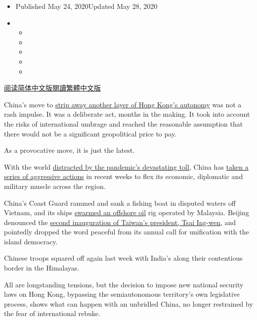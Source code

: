 \begin{itemize}
\item
  Published May 24, 2020Updated May 28, 2020
\item
  \begin{itemize}
  \item
  \item
  \item
  \item
  \item
  \end{itemize}
\end{itemize}

\href{https://cn.nytimes.com/china/20200525/china-hong-kong-taiwan/}{阅读简体中文版}\href{https://cn.nytimes.com/china/20200525/china-hong-kong-taiwan/zh-hant}{閱讀繁體中文版}

China's move to
\href{https://www.nytimes.com/2020/05/23/world/asia/hong-kong-china.html}{strip
away another layer of Hong Kong's autonomy} was not a rash impulse. It
was a deliberate act, months in the making. It took into account the
risks of international umbrage and reached the reasonable assumption
that there would not be a significant geopolitical price to pay.

As a provocative move, it is just the latest.

With the world
\href{https://www.nytimes.com/2020/05/22/business/china-hong-kong-national-security.html}{distracted
by the pandemic's devastating toll}, China has
\href{https://www.nytimes.com/2020/05/21/us/politics/trump-china-hong-kong.html}{taken
a series of aggressive actions} in recent weeks to flex its economic,
diplomatic and military muscle across the region.

China's Coast Guard rammed and sank a fishing boat in disputed waters
off Vietnam, and its ships
\href{https://www.nytimes.com/2020/04/21/world/asia/coronavirus-south-china-sea-warships.html}{swarmed
an offshore oil} rig operated by Malaysia. Beijing denounced the
\href{https://www.nytimes.com/2016/05/21/world/asia/taiwan-president-tsai-ing-wen.html}{second
inauguration of Taiwan's president, Tsai Ing-wen}, and pointedly dropped
the word peaceful from its annual call for unification with the island
democracy.

Chinese troops squared off again last week with India's along their
contentious border in the Himalayas.

All are longstanding tensions, but the decision to impose new national
security laws on Hong Kong, bypassing the semiautonomous territory's own
legislative process, shows what can happen with an unbridled China, no
longer restrained by the fear of international rebuke.

